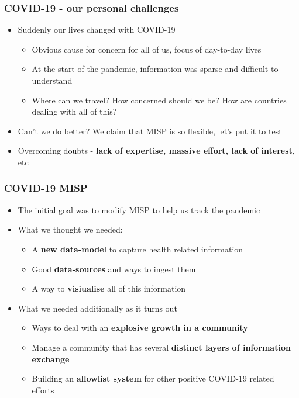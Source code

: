 \begin{frame}
 \frametitle{COVID-19 - our personal challenges}
 \begin{itemize}
         \item Suddenly our lives changed with COVID-19
         \begin{itemize}
              \item Obvious cause for concern for all of us, focus of day-to-day lives
              \item At the start of the pandemic, information was sparse and difficult to understand
              \item Where can we travel? How concerned should we be? How are countries dealing with all of this?
         \end{itemize}
         \item Can't we do better? We claim that MISP is so flexible, let's put it to test
         \item Overcoming doubts - {\bf lack of expertise, massive effort, lack of interest}, etc
 \end{itemize}
\end{frame}

\begin{frame}
 \frametitle{COVID-19 MISP}
 \begin{itemize}
         \item The initial goal was to modify MISP to help us track the pandemic
         \item What we thought we needed:
         \begin{itemize}
              \item A {\bf new data-model} to capture health related information
              \item Good {\bf data-sources} and ways to ingest them
              \item A way to {\bf visiualise} all of this information
         \end{itemize}
         \item What we needed additionally as it turns out
         \begin{itemize}
              \item Ways to deal with an {\bf explosive growth in a community}
              \item Manage a community that has several {\bf distinct layers of information exchange}
              \item Building an {\bf allowlist system} for other positive COVID-19 related efforts
         \end{itemize}
 \end{itemize}
\end{frame}

